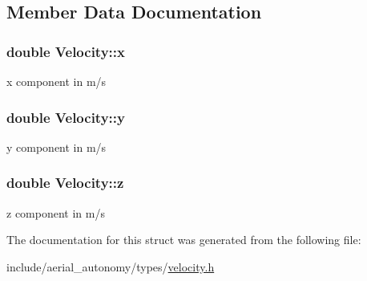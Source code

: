 \subsection{Member Data Documentation}
\hypertarget{structVelocity_a99a9f9580c8a025a2c7a18890993b56a}{
\subsubsection[{x}]{\setlength{\rightskip}{0pt plus 5cm}double Velocity\-::x}}\label{structVelocity_a99a9f9580c8a025a2c7a18890993b56a}


x component in m/s 

\hypertarget{structVelocity_ae1282d20e14cc4be4aac24ab4e1e3e5c}{
\subsubsection[{y}]{\setlength{\rightskip}{0pt plus 5cm}double Velocity\-::y}}\label{structVelocity_ae1282d20e14cc4be4aac24ab4e1e3e5c}


y component in m/s 

\hypertarget{structVelocity_aaebcd198674f7adcb61f9bb981dab465}{
\subsubsection[{z}]{\setlength{\rightskip}{0pt plus 5cm}double Velocity\-::z}}\label{structVelocity_aaebcd198674f7adcb61f9bb981dab465}


z component in m/s 



The documentation for this struct was generated from the following file\-:\begin{DoxyCompactItemize}
\item 
include/aerial\-\_\-autonomy/types/\hyperlink{velocity_8h}{velocity.\-h}\end{DoxyCompactItemize}
